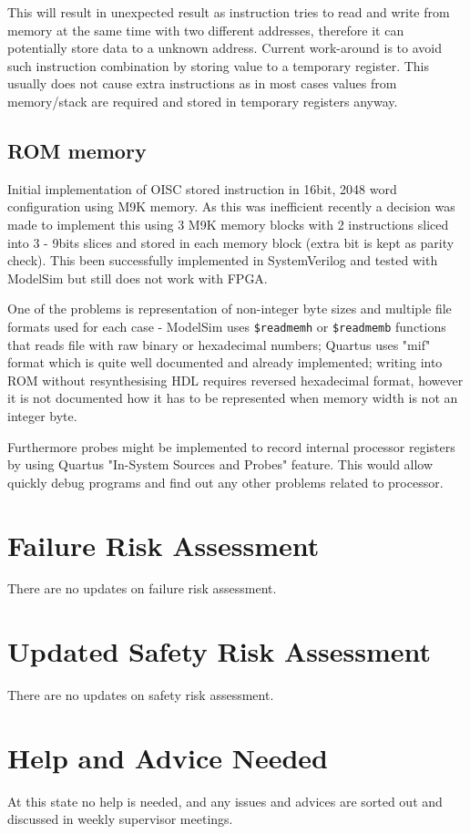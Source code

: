\documentclass[a4paper,12pt]{article}
\begin{document}
This will result in unexpected result as instruction tries to read and write from memory at the same time with two different addresses, therefore it can potentially store data to a unknown address. Current work-around is to avoid such instruction combination by storing value to a temporary register. This usually does not cause extra instructions as in most cases values from memory/stack are required and stored in temporary registers anyway. 

\subsection{ROM memory}
Initial implementation of OISC stored instruction in 16bit, 2048 word configuration using M9K memory. As this was inefficient recently a decision was made to implement this using 3 M9K memory blocks with 2 instructions sliced into 3 - 9bits slices and stored in each memory block (extra bit is kept as parity check). This been successfully implemented in SystemVerilog and tested with ModelSim but still does not work with FPGA.

One of the problems is representation of non-integer byte sizes and multiple file formats used for each case - ModelSim uses \texttt{\$readmemh} or \texttt{\$readmemb} functions that reads file with raw binary or hexadecimal numbers; Quartus uses "mif" format which is quite well documented and already implemented; writing into ROM without resynthesising HDL requires reversed hexadecimal format, however it is not documented how it has to be represented when memory width is not an integer byte. 

Furthermore probes might be implemented to record internal processor registers by using Quartus "In-System Sources and Probes" feature. This would allow quickly debug programs and find out any other problems related to processor.

\section{Failure Risk Assessment}
There are no updates on failure risk assessment. 

\section{Updated Safety Risk Assessment}
There are no updates on safety risk assessment.

\section{Help and Advice Needed}
At this state no help is needed, and any issues and advices are sorted out and discussed in weekly supervisor meetings.
\end{document}
